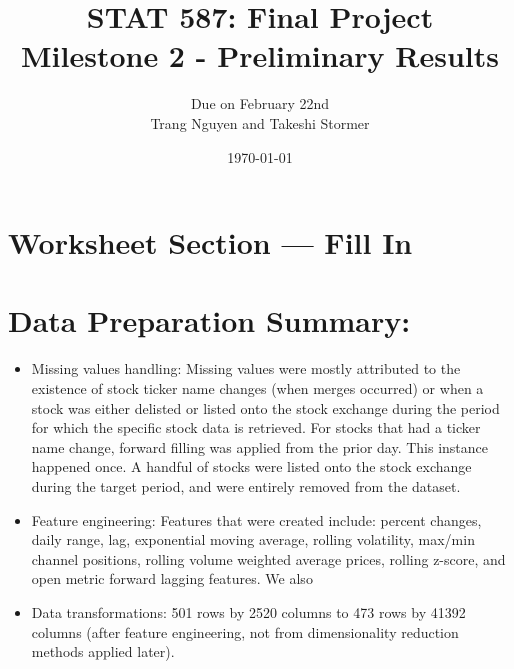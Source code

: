 \documentclass[11pt]{article}
\title{STAT 587: Final Project \\
Milestone 2 - Preliminary Results}
\author{Due on February 22nd \\
Trang Nguyen and Takeshi Stormer}
\date{\today}
\begin{document}
\maketitle
\thispagestyle{empty}       

\section*{Worksheet Section — Fill In}
\section{Data Preparation Summary:}
\begin{itemize}
    \item Missing values handling: Missing values were mostly attributed to the existence of stock ticker name changes (when merges occurred) or when a stock was either delisted or listed onto the stock exchange during the period for which the specific stock data is retrieved. For stocks that had a ticker name change, forward filling was applied from the prior day. This instance happened once. A handful of stocks were listed onto the stock exchange during the target period, and were entirely removed from the dataset.
    \item Feature engineering: Features that were created include: percent changes, daily range, lag, exponential moving average, rolling volatility, max/min channel positions, rolling volume weighted average prices, rolling z-score, and open metric forward lagging features. We also 
    \item Data transformations: 501 rows by 2520 columns to 473 rows by 41392 columns (after feature engineering, not from dimensionality reduction methods applied later).
\end{itemize}

\newpage
\end{document}
